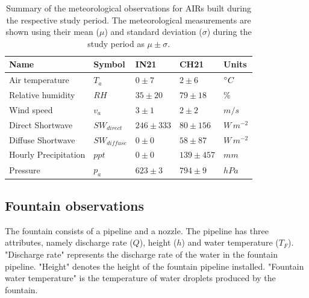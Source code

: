 
\begin{table}
	\centering
	\caption{Summary of the meteorological observations for \ac{AIRs} built during the respective study period.
		The meteorological measurements are shown using their mean ($\mu$) and standard deviation ($\sigma$) during the study
		period as $\mu \pm \sigma$. }

	\label{tab:Observations}
	\begin{tabular}{|lllll|}
		\hline
		\textbf{Name}        & \textbf{Symbol} & \textbf{IN21} & \textbf{CH21} & \textbf{Units} \\ \hline
		Air temperature      & $T_a    $       & $0 \pm 7$     & $2 \pm 6$     & $^{\circ} C$    \\
		Relative humidity    & $RH     $       & $35 \pm 20$   & $79 \pm 18$   & \%             \\
		Wind speed           & $v_a        $   & $3 \pm 1$     & $2 \pm 2$     & $m/s$          \\
		Direct Shortwave     & $SW_{direct} $  & $246 \pm 333$ & $80 \pm 156$  & $W\,m^{-2}$    \\
		Diffuse Shortwave    & $SW_{diffuse}$  & $0 \pm 0$     & $58 \pm 87$   & $W\,m^{-2}$    \\
		Hourly Precipitation & $ppt        $   & $0 \pm 0$     & $139 \pm 457$ & $mm$           \\
		Pressure             & $p_a         $  & $623 \pm 3$   & $794 \pm 9$   & $hPa$          \\\hline
	\end{tabular}
\end{table}


\subsection{Fountain observations}

The fountain consists of a pipeline and a nozzle. The pipeline has three attributes, namely discharge rate
($Q$), height ($h$) and water temperature ($T_F$). "Discharge rate" represents the discharge rate of the water in
the fountain pipeline. "Height" denotes the height of the fountain pipeline installed. "Fountain water temperature"
is the temperature of water droplets produced by the fountain.

